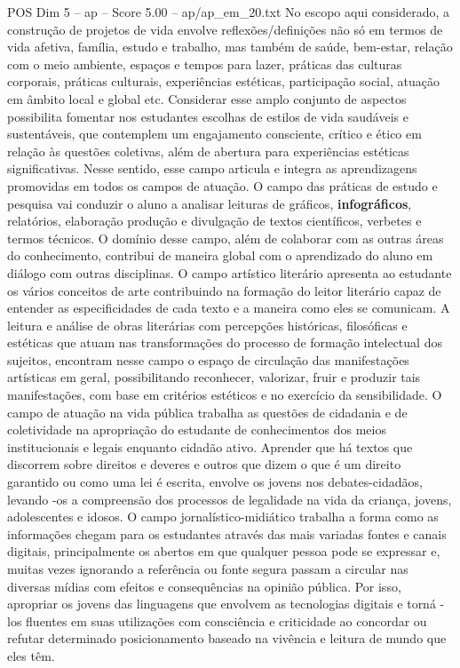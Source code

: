 \begin{textsample}{POS Dim 5 – ap – Score 5.00 – ap/ap\_em\_20.txt}
No escopo aqui considerado, a construção de projetos de vida envolve reflexões/definições não só em termos de vida afetiva, família, estudo e trabalho, mas também de saúde, bem-estar, relação com o meio ambiente, espaços e tempos para lazer, práticas das culturas corporais, práticas culturais, experiências estéticas, participação social, atuação em âmbito local e global etc.
Considerar esse amplo conjunto de aspectos possibilita fomentar nos estudantes escolhas de estilos de vida saudáveis e sustentáveis, que contemplem um engajamento consciente, crítico e ético em relação às questões coletivas, além de abertura para experiências estéticas significativas.
Nesse sentido, esse campo articula e integra as aprendizagens promovidas em todos os campos de atuação.
O campo das práticas de estudo e pesquisa vai conduzir o aluno a analisar leituras de gráficos, \textbf{infográficos}, relatórios, elaboração produção e divulgação de textos científicos, verbetes e termos técnicos.
O domínio desse campo, além de colaborar com as outras áreas do conhecimento, contribui de maneira global com o aprendizado do aluno em diálogo com outras disciplinas.
O campo artístico literário apresenta ao estudante os vários conceitos de arte contribuindo na formação do leitor literário capaz de entender as especificidades de cada texto e a maneira como eles se comunicam.
A leitura e análise de obras literárias com percepções históricas, filosóficas e estéticas que atuam nas transformações do processo de formação intelectual dos sujeitos, encontram nesse campo o espaço de circulação das manifestações artísticas em geral, possibilitando reconhecer, valorizar, fruir e produzir tais manifestações, com base em critérios estéticos e no exercício da sensibilidade.
O campo de atuação na vida pública trabalha as questões de cidadania e de coletividade na apropriação do estudante de conhecimentos dos meios institucionais e legais enquanto cidadão ativo.
Aprender que há textos que discorrem sobre direitos e deveres e outros que dizem o que é um direito garantido ou como uma lei é escrita, envolve os jovens nos debates-cidadãos, levando -os a compreensão dos processos de legalidade na vida da criança, jovens, adolescentes e idosos.
O campo jornalístico-midiático trabalha a forma como as informações chegam para os estudantes através das mais variadas fontes e canais digitais, principalmente os abertos em que qualquer pessoa pode se expressar e, muitas vezes ignorando a referência ou fonte segura passam a circular nas diversas mídias com efeitos e consequências na opinião pública.
Por isso, apropriar os jovens das linguagens que envolvem as tecnologias digitais e torná -los fluentes em suas utilizações com consciência e criticidade ao concordar ou refutar determinado posicionamento baseado na vivência e leitura de mundo que eles têm.

\end{textsample}
